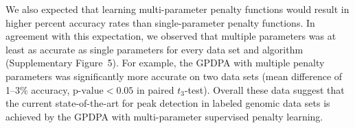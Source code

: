 \documentclass[twoside,11pt]{article}
\begin{document}
We also expected that learning multi-parameter penalty functions would
result in higher percent accuracy rates than single-parameter penalty
functions. In agreement with this expectation, we observed that
multiple parameters was at least as accurate as single parameters for
every data set and algorithm (Supplementary Figure~5). For example,
the GPDPA with multiple penalty parameters was significantly more
accurate on two data sets (mean difference of 1--3\% accuracy,
$\text{p-value}<0.05$ in paired $t_3$-test). Overall these data
suggest that the current state-of-the-art for peak detection in
labeled genomic data sets is achieved by the GPDPA with
multi-parameter supervised penalty learning.
\end{document}
